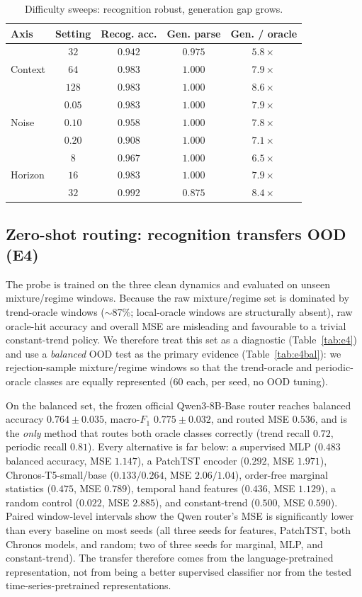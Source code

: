 \documentclass{article}
\begin{document}
\begin{table}[t]
\centering
\small
\begin{tabular}{lcccc}
\toprule
Axis & Setting & Recog. acc. & Gen. parse & Gen. / oracle \\
\midrule
\multirow{3}{*}{Context} & $32$ & $0.942$ & $0.975$ & $5.8\times$ \\
 & $64$ & $0.983$ & $1.000$ & $7.9\times$ \\
 & $128$ & $0.983$ & $1.000$ & $8.6\times$ \\
\midrule
\multirow{3}{*}{Noise} & $0.05$ & $0.983$ & $1.000$ & $7.9\times$ \\
 & $0.10$ & $0.958$ & $1.000$ & $7.8\times$ \\
 & $0.20$ & $0.908$ & $1.000$ & $7.1\times$ \\
\midrule
\multirow{3}{*}{Horizon} & $8$ & $0.967$ & $1.000$ & $6.5\times$ \\
 & $16$ & $0.983$ & $1.000$ & $7.9\times$ \\
 & $32$ & $0.992$ & $0.875$ & $8.4\times$ \\
\bottomrule
\end{tabular}
\caption{Difficulty sweeps: recognition robust, generation gap grows.}
\label{tab:asym}
\end{table}

\subsection{Zero-shot routing: recognition transfers OOD (E4)}
The probe is trained on the three clean dynamics and evaluated on unseen
mixture/regime windows.  Because the raw mixture/regime set is dominated by
trend-oracle windows ($\sim$87\%; local-oracle windows are structurally
absent), raw oracle-hit accuracy and overall MSE are misleading and
favourable to a trivial constant-trend policy.  We therefore treat this set as
a diagnostic (Table~\ref{tab:e4}) and use a \emph{balanced} OOD test as the
primary evidence (Table~\ref{tab:e4bal}): we rejection-sample mixture/regime
windows so that the trend-oracle and periodic-oracle classes are equally
represented (60 each, per seed, no OOD tuning).

On the balanced set, the frozen official Qwen3-8B-Base router reaches
balanced accuracy $0.764\pm0.035$, macro-$F_1$ $0.775\pm0.032$, and routed MSE
$0.536$, and is the \emph{only} method that routes both oracle classes
correctly (trend recall $0.72$, periodic recall $0.81$).  Every alternative is
far below: a supervised MLP ($0.483$ balanced accuracy, MSE $1.147$), a
PatchTST encoder ($0.292$, MSE $1.971$), Chronos-T5-small/base ($0.133/0.264$,
MSE $2.06/1.04$), order-free marginal statistics ($0.475$, MSE $0.789$),
temporal hand features ($0.436$, MSE $1.129$), a random control ($0.022$, MSE
$2.885$), and constant-trend ($0.500$, MSE $0.590$).  Paired window-level
intervals show the Qwen router's MSE is significantly lower than every
baseline on most seeds (all three seeds for features, PatchTST, both Chronos
models, and random; two of three seeds for marginal, MLP, and constant-trend).
The transfer therefore comes from the language-pretrained representation, not
from being a better supervised classifier nor from the tested
time-series-pretrained representations.
\end{document}
